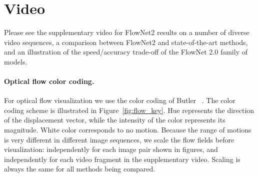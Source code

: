 \documentclass[10pt,twocolumn,letterpaper]{article}%
\begin{document}
{\small


}

\cleardoublepage


\setcounter{page}{1}


\setcounter{section}{0} 
\setcounter{figure}{0}
\setcounter{table}{0} 
\setcounter{equation}{0} 



\maketitle

\section{Video} 

Please see the supplementary video for FlowNet2 results on a number of diverse video sequences, a comparison between FlowNet2 and state-of-the-art methods, and an illustration of the speed/accuracy trade-off of the FlowNet 2.0 family of models.

\paragraph{Optical flow color coding.} For optical flow visualization we use the color coding of Butler \etal~\cite{sintel}.
The color coding scheme is illustrated in Figure~\ref{fig:flow_key}. 
Hue represents the direction of the displacement vector, while the intensity of the color represents its magnitude.
White color corresponds to no motion.
Because the range of motions is very different in different image sequences, we scale the flow fields before visualization: 
independently for each image pair shown in figures, and independently for each video fragment in the supplementary video.
Scaling is always the same for all methods being compared.
\end{document}
